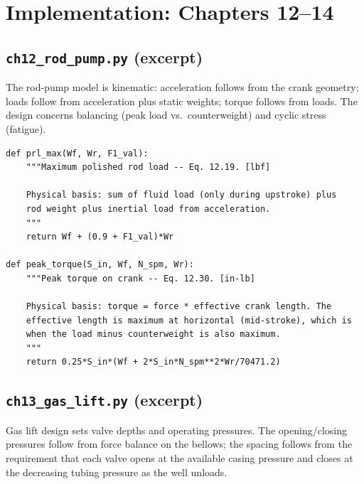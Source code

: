 \documentclass[11pt,a4paper,openany]{book}
\newcommand{\code}[1]{\texttt{#1}}
\begin{document}
\chapter{Implementation: Chapters 12--14}

\section{\code{ch12\_rod\_pump.py} (excerpt)}

\begin{theory}
The rod-pump model is kinematic: acceleration follows from the
crank geometry; loads follow from acceleration plus static weights;
torque follows from loads. The design concerns balancing (peak load
vs.\ counterweight) and cyclic stress (fatigue).
\end{theory}

\begin{lstlisting}
def prl_max(Wf, Wr, F1_val):
    """Maximum polished rod load -- Eq. 12.19. [lbf]

    Physical basis: sum of fluid load (only during upstroke) plus
    rod weight plus inertial load from acceleration.
    """
    return Wf + (0.9 + F1_val)*Wr

def peak_torque(S_in, Wf, N_spm, Wr):
    """Peak torque on crank -- Eq. 12.30. [in-lb]

    Physical basis: torque = force * effective crank length. The
    effective length is maximum at horizontal (mid-stroke), which is
    when the load minus counterweight is also maximum.
    """
    return 0.25*S_in*(Wf + 2*S_in*N_spm**2*Wr/70471.2)
\end{lstlisting}

\section{\code{ch13\_gas\_lift.py} (excerpt)}

\begin{theory}
Gas lift design sets valve depths and operating pressures. The
opening/closing pressures follow from force balance on the bellows;
the spacing follows from the requirement that each valve opens at
the available casing pressure and closes at the decreasing tubing
pressure as the well unloads.
\end{theory}
\end{document}
